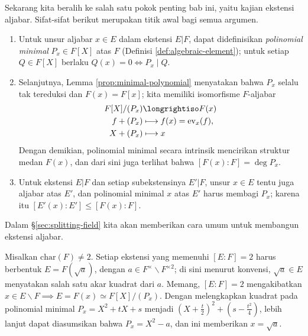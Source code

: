 Sekarang kita beralih ke salah satu pokok penting bab ini, yaitu kajian ekstensi aljabar. Sifat-sifat berikut merupakan titik awal bagi semua argumen.
\begin{enumerate}
	\item Untuk unsur aljabar $x \in E$ dalam ekstensi $E|F$, dapat didefinisikan \emph{polinomial minimal} $P_x \in F[X]$ atas $F$ (Definisi \ref{def:algebraic-element}); untuk setiap $Q \in F[X]$ berlaku $Q(x) = 0 \iff P_x \mid Q$.
	\item Selanjutnya, Lemma \ref{prop:minimal-polynomial} menyatakan bahwa $P_x$ selalu tak tereduksi dan $F(x) = F[x]$; kita memiliki isomorfisme $F$-aljabar
		\begin{align*}
			F[X]/(P_x) & \longrightiso F(x) \\
			f + (P_x) & \longmapsto f(x) = \text{ev}_x(f), \\
			X + (P_x) & \longmapsto x
		\end{align*}
		Dengan demikian, polinomial minimal secara intrinsik mencirikan struktur medan $F(x)$, dan dari sini juga terlihat bahwa $[F(x):F] = \deg P_x$.
	\item Untuk ekstensi $E|F$ dan setiap subekstensinya $E'|F$, unsur $x \in E$ tentu juga aljabar atas $E'$, dan polinomial minimal $x$ atas $E'$ harus membagi $P_x$; karena itu $[E'(x):E'] \leq [F(x):F]$.
\end{enumerate}
Dalam \S\ref{sec:splitting-field} kita akan memberikan cara umum untuk membangun ekstensi aljabar.

\begin{example}
	Misalkan $\text{char}(F) \neq 2$. Setiap ekstensi yang memenuhi $[E:F]=2$ harus berbentuk $E = F(\sqrt{a})$, dengan $a \in F^\times \smallsetminus F^{\times 2}$; di sini menurut konvensi, $\sqrt{a} \in E$ menyatakan salah satu akar kuadrat dari $a$. Memang, $[E:F]=2$ mengakibatkan $x \in E \smallsetminus F \implies E = F(x) \simeq F[X]/(P_x)$. Dengan melengkapkan kuadrat pada polinomial minimal $P_x = X^2 + tX + s$ menjadi $(X + \frac{t}{2})^2 + (s - \frac{t^2}{4})$, lebih lanjut dapat diasumsikan bahwa $P_x = X^2 - a$, dan ini memberikan $x = \sqrt{a}$.
\end{example}

